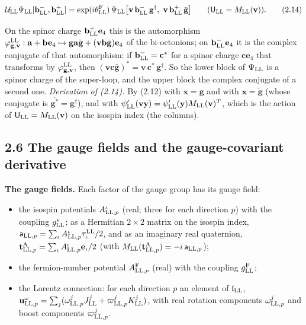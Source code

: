 \documentclass[
  10pt,
]{article}
\providecommand{\tightlist}{%
  \setlength{\itemsep}{0pt}\setlength{\parskip}{0pt}}
\begin{document}
\[\mathcal U_{\rm LL}\Psi_{\rm LL}[\mathbf b^-_{\rm LL},\mathbf b^+_{\rm LL}]=\exp(i\theta^{\rm F}_{\rm LL})\,\Psi_{\rm LL}\big[\mathbf v\,\mathbf b^-_{\rm LL}\,\mathbf g^\dagger,\ \mathbf v\,\mathbf b^+_{\rm LL}\,\bar{\mathbf g}\big]\qquad(\mathsf U_{\rm LL}=M_{\rm LL}(\mathbf v)).\tag{2.14}\]

On the spinor charge \(\mathbf b^+_{\rm LL}\mathbf e_4\) this is the
automorphism
\(\varphi^{\rm LL}_{\mathbf g,\mathbf v}:\mathbf a+\mathbf b\mathbf e_4\mapsto\mathbf g\mathbf a\bar{\mathbf g}+(\mathbf v\mathbf b\bar{\mathbf g})\mathbf e_4\)
of the bi-octonions; on \(\mathbf b^-_{\rm LL}\mathbf e_4\) it is the
complex conjugate of that automorphism: if
\(\mathbf b^-_{\rm LL}=\mathbf c^*\) for a spinor charge
\(\mathbf c\mathbf e_4\) that transforms by
\(\varphi^{\rm LL}_{\mathbf g,\mathbf v}\), then
\((\mathbf v\mathbf c\bar{\mathbf g})^*=\mathbf v\,\mathbf c^*\,\mathbf g^\dagger\).
So the lower block of \(\Psi_{\rm LL}\) is a spinor charge of the
super-loop, and the upper block the complex conjugate of a second one.
\emph{Derivation of (2.14).} By (2.12) with \(\mathbf x=\mathbf g\) and
with \(\mathbf x=\tilde{\mathbf g}\) (whose conjugate is
\(\overline{\mathbf g^*}=\mathbf g^\dagger\)), and with
\(\psi'_{\rm LL}(\mathbf v\mathbf y)=\psi'_{\rm LL}(\mathbf y)M_{\rm LL}(\mathbf v)^T\),
which is the action of \(\mathsf U_{\rm LL}=M_{\rm LL}(\mathbf v)\) on
the isospin index (the columns).

\hypertarget{the-gauge-fields-and-the-gauge-covariant-derivative}{%
\subsection{2.6 The gauge fields and the gauge-covariant
derivative}\label{the-gauge-fields-and-the-gauge-covariant-derivative}}

\textbf{The gauge fields.} Each factor of the gauge group has its gauge
field:

\begin{itemize}
\tightlist
\item
  the isospin potentials \(A^\iota_{{\rm LL},p}\) (real; three for each
  direction \(p\)) with the coupling \(g^{\rm v}_{\rm LL}\); as a
  Hermitian \(2\times2\) matrix on the isospin index,
  \(\mathsf a_{{\rm LL},p}=\sum_\iota A^\iota_{{\rm LL},p}\tau^{\rm LL}_\iota/2\),
  and as an imaginary real quaternion,
  \(\mathbf t^{\rm A}_{{\rm LL},p}=\sum_\iota A^\iota_{{\rm LL},p}\mathbf e_\iota/2\)
  (with
  \(M_{\rm LL}(\mathbf t^{\rm A}_{{\rm LL},p})=-i\,\mathsf a_{{\rm LL},p}\));
\item
  the fermion-number potential \(A^{\rm F}_{{\rm LL},p}\) (real) with
  the coupling \(g^{\rm F}_{\rm LL}\);
\item
  the Lorentz connection: for each direction \(p\) an element of
  \(\mathfrak l_{\rm LL}\),
  \(\mathbf u^\omega_{{\rm LL},p}=\sum_j(\omega^j_{{\rm LL},p}J^j_{\rm LL}+\varpi^j_{{\rm LL},p}K^j_{\rm LL})\),
  with real rotation components \(\omega^j_{{\rm LL},p}\) and boost
  components \(\varpi^j_{{\rm LL},p}\).
\end{itemize}
\end{document}
